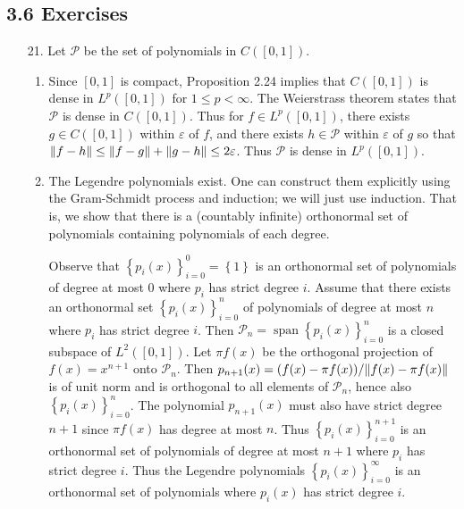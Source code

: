 \documentclass[11pt,leqno]{article}
\theoremstyle{plain}
\theoremstyle{definition}
\numberwithin{equation}{section}
\numberwithin{lem}{section}
\newcommand{\cbr}[1]{\left\{#1\right\}}
\DeclareMathOperator{\Span}{span}
\begin{document}
\subsection*{3.6 Exercises}
\begin{enumerate}
    \item[21.] Let $\mathcal P$ be the set of polynomials in $C([0,1])$.
    \begin{enumerate}
        \item Since $[0,1]$ is compact, Proposition 2.24 implies that $C([0,1])$ is dense in $L^p([0,1])$ for $1\leq p <\infty$. The Weierstrass theorem states that $\mathcal P$ is dense in $C([0,1])$. Thus for $f\in L^p([0,1])$, there exists $g\in C([0,1])$ within $\varepsilon$ of $f$, and there exists $h\in \mathcal P$ within $\varepsilon$ of $g$ so that $\norm{f-h}\leq \norm{f-g} + \norm{g-h}\leq 2\varepsilon$. Thus $\mathcal P$ is dense in $L^p([0,1])$.
        \item The Legendre polynomials exist. One can construct them explicitly using the Gram-Schmidt process and induction; we will just use induction. That is, we show that there is a (countably infinite) orthonormal set of polynomials containing polynomials of each degree.
        
        Observe that $\cbr{p_i(x)}_{i=0}^0 = \cbr{1}$ is an orthonormal set of polynomials of degree at most $0$ where $p_i$ has strict degree $i$. Assume that there exists an orthonormal set $\cbr{p_i(x)}_{i=0}^n$ of polynomials of degree at most $n$ where $p_i$ has strict degree $i$. Then $\mathcal P_n = \Span \cbr{p_i(x)}_{i=0}^n$ is a closed subspace of $L^2([0,1])$. Let $\pi f(x)$ be the orthogonal projection of $f(x) = x^{n+1}$ onto $\mathcal P_n$. Then $p_{n+1}(x) = (f(x)-\pi f(x))/\norm{f(x)-\pi f(x)}$ is of unit norm and is orthogonal to all elements of $\mathcal P_n$, hence also $\cbr{p_i(x)}_{i=0}^n$. The polynomial $p_{n+1}(x)$ must also have strict degree $n+1$ since $\pi f(x)$ has degree at most $n$. Thus $\cbr{p_i(x)}_{i=0}^{n+1}$ is an orthonormal set of polynomials of degree at most $n+1$ where $p_i$ has strict degree $i$. Thus the Legendre polynomials $\cbr{p_i(x)}_{i=0}^\infty$ is an orthonormal set of polynomials where $p_i(x)$ has strict degree $i$.


\end{enumerate}
\end{enumerate}
\end{document}
